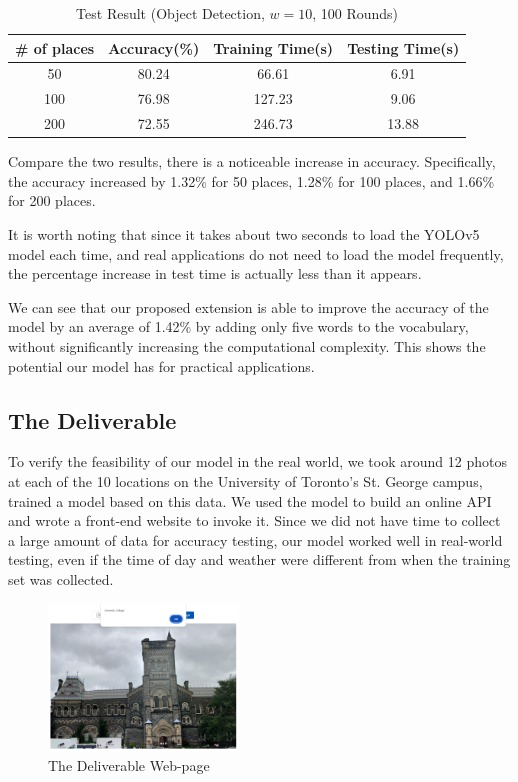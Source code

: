 \documentclass[conference]{IEEEtran}
\begin{document}
\begin{table}[ht]
    \centering
    \caption{Test Result (Object Detection, $w = 10$, 100 Rounds)}
    \begin{tabular}{|c|c|c|c|}
    \hline \textbf{\# of places} & \textbf{Accuracy(\%)} & \textbf{Training Time(s)} & \textbf{Testing Time(s)}\\
    \hline 50 & 80.24 & 66.61 & 6.91\\
    \hline 100 & 76.98 & 127.23 & 9.06\\
    \hline 200 & 72.55 & 246.73 & 13.88\\
    \hline
    \end{tabular}
\end{table}


Compare the two results, there is a noticeable increase in accuracy. Specifically, the accuracy increased by 1.32\% for 50 places, 1.28\% for 100 places, and 1.66\% for 200 places.

It is worth noting that since it takes about two seconds to load the YOLOv5 model each time, and real applications do not need to load the model frequently, the percentage increase in test time is actually less than it appears.

We can see that our proposed extension is able to improve the accuracy of the model by an average of 1.42\% by adding only five words to the vocabulary, without significantly increasing the computational complexity. This shows the potential our model has for practical applications.

\subsection{The Deliverable}

To verify the feasibility of our model in the real world, we took around 12 photos at each of the 10 locations on the University of Toronto's St. George campus, trained a model based on this data. We used the model to build an online API and wrote a front-end website to invoke it. Since we did not have time to collect a large amount of data for accuracy testing, our model worked well in real-world testing, even if the time of day and weather were different from when the training set was collected.

\begin{figure}[H]
    \centering
    \includegraphics[width=0.45\textwidth]{fig_4.png}
    \caption{The Deliverable Web-page}
    \label{fig:4}
\end{figure}
\end{document}
